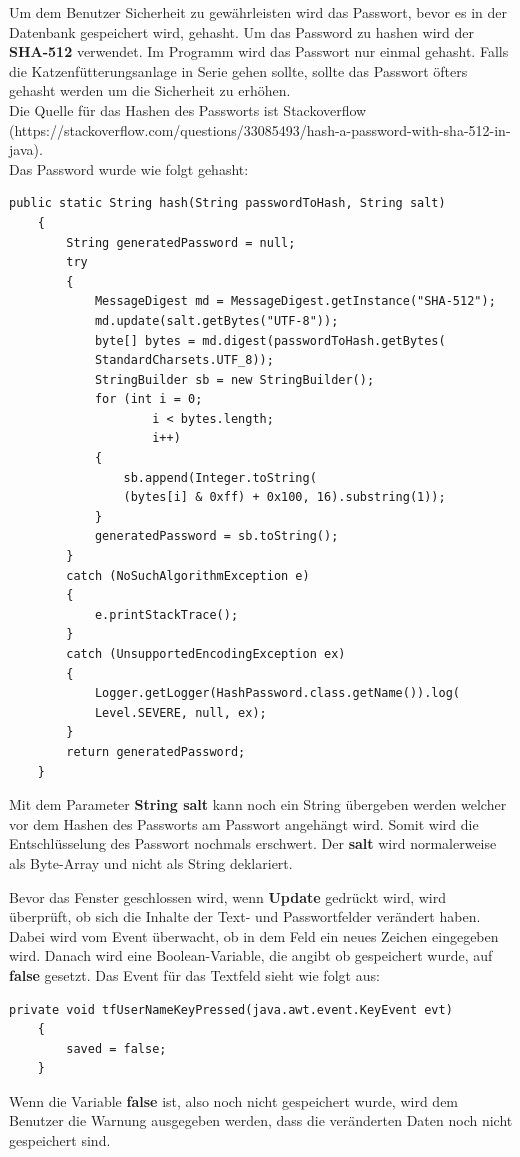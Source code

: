 Um dem Benutzer Sicherheit zu gewährleisten wird das Passwort, bevor es in der Datenbank gespeichert wird, gehasht. Um das Password zu hashen wird der \textbf{SHA-512} verwendet. Im Programm wird das Passwort nur einmal gehasht. Falls die Katzenfütterungsanlage in Serie gehen sollte, sollte das Passwort öfters gehasht werden um die Sicherheit zu erhöhen.
\\ Die Quelle für das Hashen des Passworts ist Stackoverflow (https://stackoverflow.com/questions/33085493/hash-a-password-with-sha-512-in-java).
\\ Das Password wurde wie folgt gehasht:
\begin{lstlisting}[style=Javastyle, caption=Hash Passwort]
    public static String hash(String passwordToHash, String salt)
    {
        String generatedPassword = null;
        try
        {
            MessageDigest md = MessageDigest.getInstance("SHA-512");
            md.update(salt.getBytes("UTF-8"));
            byte[] bytes = md.digest(passwordToHash.getBytes(
            StandardCharsets.UTF_8));
            StringBuilder sb = new StringBuilder();
            for (int i = 0;
                    i < bytes.length;
                    i++)
            {
                sb.append(Integer.toString(
                (bytes[i] & 0xff) + 0x100, 16).substring(1));
            }
            generatedPassword = sb.toString();
        }
        catch (NoSuchAlgorithmException e)
        {
            e.printStackTrace();
        }
        catch (UnsupportedEncodingException ex)
        {
            Logger.getLogger(HashPassword.class.getName()).log(
            Level.SEVERE, null, ex);
        }
        return generatedPassword;
    }
\end{lstlisting}
Mit dem Parameter \textbf{String salt} kann noch ein String übergeben werden welcher vor dem Hashen des Passworts am Passwort angehängt wird. Somit wird die Entschlüsselung des Passwort nochmals erschwert. Der  \textbf{salt} wird normalerweise als Byte-Array und nicht als String deklariert.

\vspace{10pt}

Bevor das Fenster geschlossen wird, wenn \textbf{Update} gedrückt wird, wird überprüft, ob sich die Inhalte der Text- und Passwortfelder verändert haben. Dabei wird vom Event überwacht, ob in dem Feld ein neues Zeichen eingegeben wird. Danach wird eine Boolean-Variable, die angibt ob gespeichert wurde, auf \textbf{false} gesetzt. Das Event für das Textfeld sieht wie folgt aus:
\begin{lstlisting}[style=Javastyle, caption=Textfeld Event]
	private void tfUserNameKeyPressed(java.awt.event.KeyEvent evt)                                       
	{                                           
		saved = false;
	}
\end{lstlisting}
Wenn die Variable \textbf{false} ist, also noch nicht gespeichert wurde, wird dem Benutzer die Warnung ausgegeben werden, dass die veränderten Daten noch nicht gespeichert sind.


